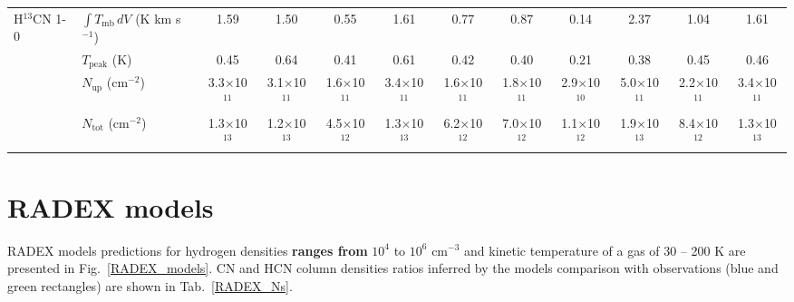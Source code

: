 \documentclass{aa}
\begin{document}
\begin{appendix}
\begin{sidewaystable*}
\begin{tabular}{l l c c c c c c c c c c}
\multirow{4}{*}{H$^{13}$CN 1-0} & $\int{T_{\mathrm{mb}} \, dV}$ (K km s$^{-1}$) & 1.59 & 1.50 & 0.55 & 1.61 & 0.77 & 0.87 & 0.14 & 2.37 & 1.04 & 1.61 \\
& $T_\mathrm{peak}$ (K) & 0.45 & 0.64 & 0.41 & 0.61 & 0.42 & 0.40 & 0.21 & 0.38 & 0.45 & 0.46 \\
& $N_\mathrm{up}$ (cm$^{-2}$) & 3.3$\times$10$^{11}$ & 3.1$\times$10$^{11}$ & 1.6$\times$10$^{11}$ & 3.4$\times$10$^{11}$ & 1.6$\times$10$^{11}$ & 1.8$\times$10$^{11}$ & 2.9$\times$10$^{10}$ & 5.0$\times$10$^{11}$ & 2.2$\times$10$^{11}$ & 3.4$\times$10$^{11}$ \\
& $N_\mathrm{tot}$ (cm$^{-2}$) & 1.3$\times$10$^{13}$ & 1.2$\times$10$^{13}$ & 4.5$\times$10$^{12}$ & 1.3$\times$10$^{13}$ & 6.2$\times$10$^{12}$ & 7.0$\times$10$^{12}$ & 1.1$\times$10$^{12}$ & 1.9$\times$10$^{13}$ & 8.4$\times$10$^{12}$ & 1.3$\times$10$^{13}$\\

\hline\hline
\end{tabular}
\end{sidewaystable*}

\section{RADEX models}
\label{app:radex}

RADEX models predictions for hydrogen densities \textbf{ranges from} $10^{4}$ to $10^{6}$ cm$^{-3}$ and kinetic temperature of a gas of 30 – 200 K are presented in Fig.~\ref{RADEX_models}. CN and HCN column densities ratios inferred by the models comparison with observations (blue and green rectangles) are shown in Tab.~\ref{RADEX_Ns}.


\end{appendix}
\end{document}

